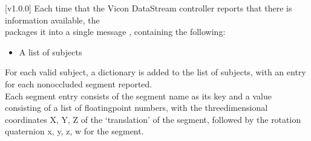 [v1.0.0]
Each time that the Vicon DataStream controller reports that there is information
available, the\\
 packages it into a single message
\openSq{}\closeSq, containing the following:
\begin{itemize}
\item A list of subjects
\end{itemize}

For each valid subject, a dictionary \openSq{}\closeSq{} is added to the
list of subjects, with an entry for each non\longDash{}occluded segment reported.\\

Each segment entry consists of the segment name as its key and a value consisting of a
list of floating\longDash{}point numbers, with the three\longDash{}dimensional coordinates
\openSq{}X, Y, Z\closeSq{} of the `translation' of the segment, followed by the rotation
quaternion \openSq{}x, y, z, w\closeSq{} for the segment.
\appendixEnd{}
